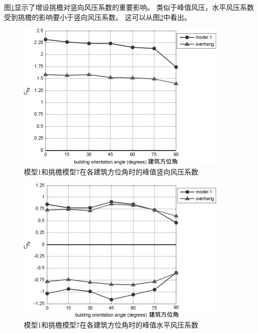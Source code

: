 \documentclass{ctexart}
\begin{document}
图\ref{fig:11}显示了增设挑檐对竖向风压系数的重要影响。
类似于峰值风压，水平风压系数受到挑檐的影响要小于竖向风压系数。
这可以从图\ref{fig:12}中看出。
\begin{figure}
\centering
\includegraphics{./fig/11.jpg}
\caption{模型1和挑檐模型7在各建筑方位角时的峰值竖向风压系数}
\label{fig:11}
\end{figure}

\begin{figure}
\centering
\includegraphics{./fig/12.jpg}
\caption{模型1和挑檐模型7在各建筑方位角时的峰值水平风压系数}
\label{fig:12}
\end{figure}
\end{document}
